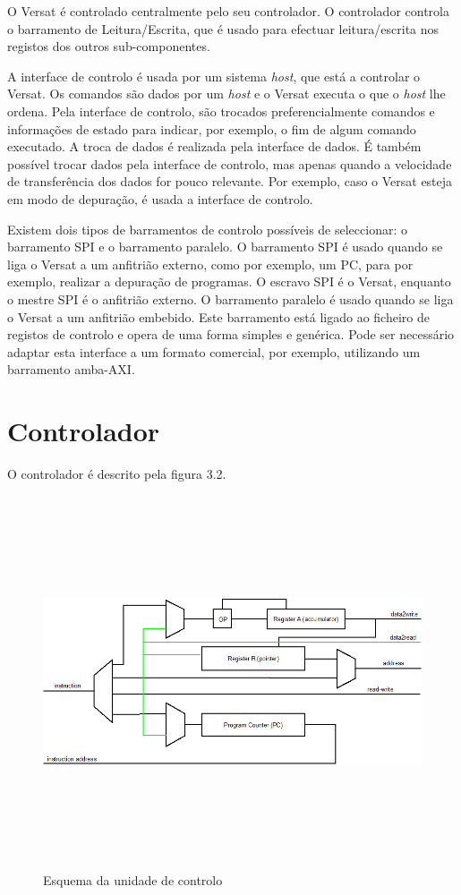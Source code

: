 O Versat é controlado centralmente pelo seu controlador. O controlador controla o barramento de Leitura/Escrita, que é usado para efectuar leitura/escrita nos registos dos outros sub-componentes. 





A interface de controlo é usada por um sistema {\it host}, que está a controlar o Versat. Os comandos são dados por um {\it host} e o Versat executa o que o {\it host} lhe ordena. Pela interface de controlo, são trocados preferencialmente comandos e informações de estado para indicar, por exemplo, o fim de algum comando executado. A troca de dados é realizada pela interface de dados. É também possível trocar dados pela interface de controlo, mas apenas quando a velocidade de transferência dos dados for pouco relevante. Por exemplo, caso o Versat esteja em modo de depuração, é usada a interface de controlo.

Existem dois tipos de barramentos de controlo possíveis de seleccionar: o barramento SPI e o barramento paralelo. 
O barramento SPI é usado quando se liga o Versat a um anfitrião externo, como por exemplo, um PC, para por exemplo, realizar a depuração de programas. O escravo SPI é o Versat, enquanto o mestre SPI é o anfitrião externo. 
O barramento paralelo é usado quando se liga o Versat a um anfitrião embebido. Este barramento está ligado ao ficheiro de registos de controlo e opera de uma forma simples e genérica. Pode ser necessário adaptar esta interface a um formato comercial, por exemplo, utilizando um barramento amba-AXI.


\section{Controlador}
\label{section:Controlador}

O controlador é descrito pela figura 3.2.

\begin{figure}[!htb]
  \centering
  \includegraphics[height=110mm, width=155mm]{Figures/Controlador_MESMO.png}
  \caption[Esquema da unidade de controlo]{Esquema da unidade de controlo}  
  \label{fig:Esquema_Unidade_Controlo}
\end{figure}

